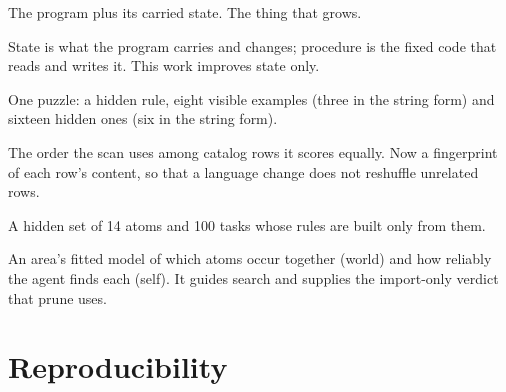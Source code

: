 \documentclass[11pt]{article}
\begin{document}
\begin{description}[leftmargin=*,style=nextline]
\item[Seed agent] The program plus its carried state. The thing that grows.
\item[State and procedure] State is what the program carries and changes; procedure is the fixed code that reads and writes it. This work improves state only.
\item[Task] One puzzle: a hidden rule, eight visible examples (three in the string form) and sixteen hidden ones (six in the string form).
\item[Tie-break] The order the scan uses among catalog rows it scores equally. Now a fingerprint of each row's content, so that a language change does not reshuffle unrelated rows.
\item[World] A hidden set of 14 atoms and 100 tasks whose rules are built only from them.
\item[World and self model] An area's fitted model of which atoms occur together (world) and how reliably the agent finds each (self). It guides search and supplies the import-only verdict that prune uses.
\end{description}

\section{Reproducibility}
\end{document}
